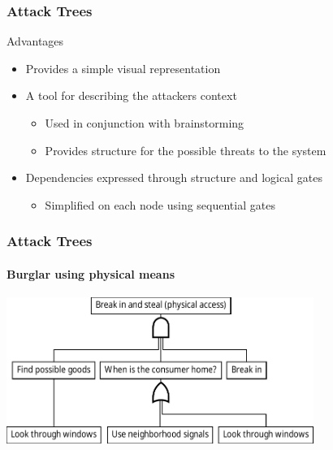 

\begin{frame}\frametitle{Attack Trees}
  \begin{block}{Advantages}
    \begin{itemize}
      \item Provides a simple visual representation
      \item A tool for describing the attackers context
      \begin{itemize}
        \item Used in conjunction with brainstorming
        \item Provides structure for the possible threats to the system
      \end{itemize}
      \item Dependencies expressed through structure and logical gates
      \begin{itemize}
        \item Simplified on each node using sequential gates
      \end{itemize}
    \end{itemize}
  \end{block}
\end{frame}

\begin{frame}\frametitle{Attack Trees}
\framesubtitle{Burglar using physical means}
\centering
\includegraphics[width=10cm]{graphics/burglarPhysical}
\end{frame}

